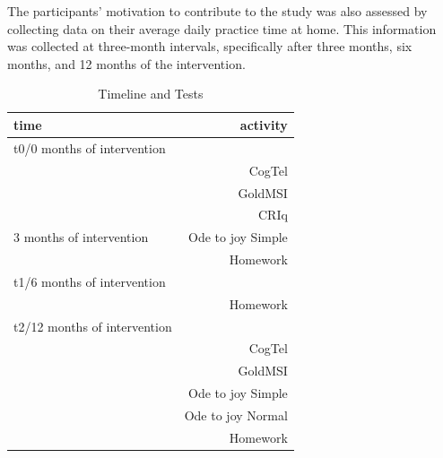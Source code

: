 The participants' motivation to contribute to the study was also assessed by collecting data on their average daily practice time at home. This information was collected at three-month intervals, specifically after three months, six months, and 12 months of the intervention. 

\begin{table}[t]
	\centering
	\caption{Timeline and Tests}
	\label{tab:time}
	\vspace{\medskipamount}
	\renewcommand{\arraystretch}{1.2}
	\begin{tabular}{lr}
		time	&   activity       \\
		\hline
		t0/0 months of intervention        & %
		\\& CogTel\\
		& GoldMSI\\
		& CRIq\\	 	
		\hline
		3 months of intervention & Ode to joy Simple\\
		& Homework\\
		\hline
		t1/6 months of intervention    		& %
		\\& Homework\\
		\hline
		t2/12 months of intervention    		& %
		\\& CogTel\\
		& GoldMSI\\
		& Ode to joy Simple \\
		& Ode to joy Normal \\
		& Homework\\
	\end{tabular}
\end{table}

